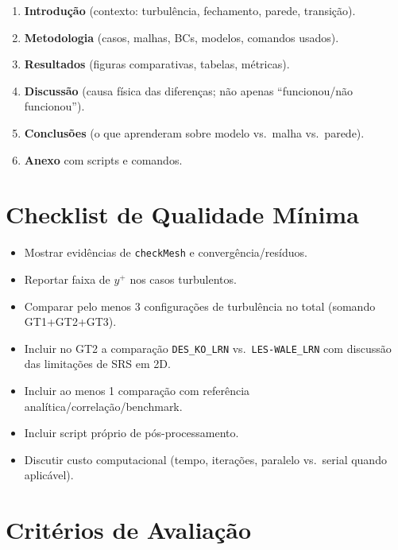 \documentclass[12pt,a4paper]{article}
\newcommand{\checkbox}{$\square$}
\begin{document}
\begin{enumerate}
  \item \textbf{Introdução} (contexto: turbulência, fechamento, parede, transição).
  \item \textbf{Metodologia} (casos, malhas, BCs, modelos, comandos usados).
  \item \textbf{Resultados} (figuras comparativas, tabelas, métricas).
  \item \textbf{Discussão} (causa física das diferenças; não apenas ``funcionou/não funcionou'').
  \item \textbf{Conclusões} (o que aprenderam sobre modelo vs.\ malha vs.\ parede).
  \item \textbf{Anexo} com scripts e comandos.
\end{enumerate}

\section{Checklist de Qualidade Mínima}

\begin{itemize}[label=\checkbox]
  \item Mostrar evidências de \texttt{checkMesh} e convergência/resíduos.
  \item Reportar faixa de $y^+$ nos casos turbulentos.
  \item Comparar pelo menos 3 configurações de turbulência no total (somando GT1+GT2+GT3).
  \item Incluir no GT2 a comparação \texttt{DES\_KO\_LRN} vs.\ \texttt{LES-WALE\_LRN} com discussão das limitações de SRS em 2D.
  \item Incluir ao menos 1 comparação com referência analítica/correlação/benchmark.
  \item Incluir script próprio de pós-processamento.
  \item Discutir custo computacional (tempo, iterações, paralelo vs.\ serial quando aplicável).
\end{itemize}

\section{Critérios de Avaliação}
\end{document}
